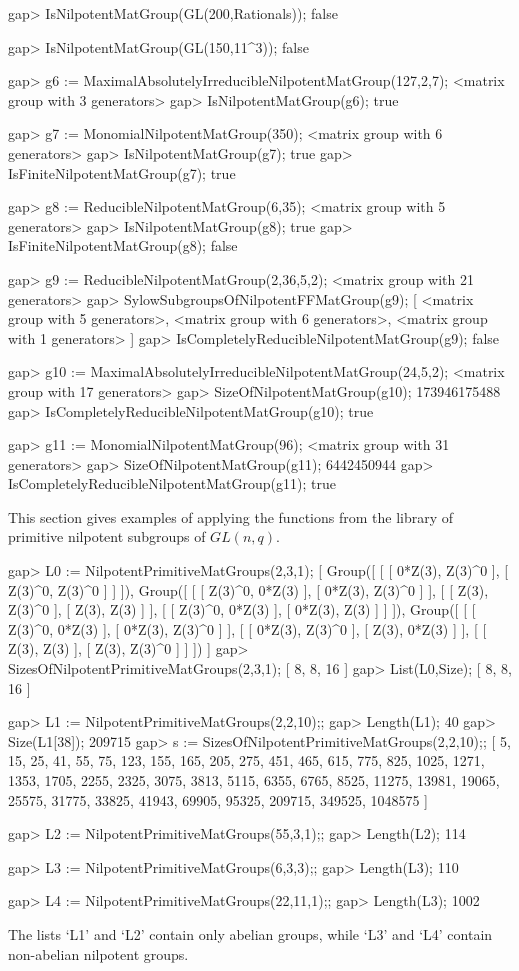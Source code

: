 \beginexample
gap> IsNilpotentMatGroup(GL(200,Rationals));
false

gap> IsNilpotentMatGroup(GL(150,11^3));
false

gap> g6 := MaximalAbsolutelyIrreducibleNilpotentMatGroup(127,2,7);
<matrix group with 3 generators>
gap> IsNilpotentMatGroup(g6);
true

gap> g7 := MonomialNilpotentMatGroup(350);
<matrix group with 6 generators>
gap> IsNilpotentMatGroup(g7);
true
gap> IsFiniteNilpotentMatGroup(g7);
true

gap> g8 := ReducibleNilpotentMatGroup(6,35);
<matrix group with 5 generators>
gap> IsNilpotentMatGroup(g8);
true
gap> IsFiniteNilpotentMatGroup(g8);
false

gap> g9 := ReducibleNilpotentMatGroup(2,36,5,2);
<matrix group with 21 generators>
gap> SylowSubgroupsOfNilpotentFFMatGroup(g9);
[ <matrix group with 5 generators>, <matrix group with 6
generators>, <matrix group with 1 generators> ]
gap> IsCompletelyReducibleNilpotentMatGroup(g9);
false

gap> g10 := MaximalAbsolutelyIrreducibleNilpotentMatGroup(24,5,2);
<matrix group with 17 generators>
gap> SizeOfNilpotentMatGroup(g10);
173946175488
gap> IsCompletelyReducibleNilpotentMatGroup(g10);
true

gap> g11 := MonomialNilpotentMatGroup(96);
<matrix group with 31 generators>
gap> SizeOfNilpotentMatGroup(g11);
6442450944
gap> IsCompletelyReducibleNilpotentMatGroup(g11);
true
\endexample


This section gives examples of applying the functions from the
 library of primitive nilpotent subgroups of $GL(n,q)$.

\beginexample
gap> L0 := NilpotentPrimitiveMatGroups(2,3,1);
[ Group([ [ [ 0*Z(3), Z(3)^0 ], [ Z(3)^0, Z(3)^0 ] ] ]),
  Group([ [ [ Z(3)^0, 0*Z(3) ], [ 0*Z(3), Z(3)^0 ] ],
      [ [ Z(3), Z(3)^0 ], [ Z(3), Z(3) ] ],
      [ [ Z(3)^0, 0*Z(3) ], [ 0*Z(3), Z(3) ] ] ]),
  Group([ [ [ Z(3)^0, 0*Z(3) ], [ 0*Z(3), Z(3)^0 ] ],
      [ [ 0*Z(3), Z(3)^0 ], [ Z(3), 0*Z(3) ] ],
      [ [ Z(3), Z(3) ], [ Z(3), Z(3)^0 ] ] ]) ]
gap> SizesOfNilpotentPrimitiveMatGroups(2,3,1);
[ 8, 8, 16 ]
gap> List(L0,Size);
[ 8, 8, 16 ]

gap> L1 := NilpotentPrimitiveMatGroups(2,2,10);;
gap> Length(L1);
40
gap> Size(L1[38]);
209715
gap> s := SizesOfNilpotentPrimitiveMatGroups(2,2,10);;
[ 5, 15, 25, 41, 55, 75, 123, 155,
165, 205, 275, 451, 465, 615, 775, 825, 1025, 1271, 1353, 1705,
2255, 2325, 3075, 3813, 5115, 6355, 6765, 8525, 11275, 13981,
19065, 25575, 31775, 33825, 41943, 69905, 95325, 209715,
349525, 1048575 ]

gap> L2 := NilpotentPrimitiveMatGroups(55,3,1);;
gap> Length(L2);
114

gap> L3 := NilpotentPrimitiveMatGroups(6,3,3);;
gap> Length(L3);
110

gap> L4 := NilpotentPrimitiveMatGroups(22,11,1);;
gap> Length(L3);
1002
\endexample

The lists `L1' and `L2' contain only abelian groups, while `L3' and
`L4' contain non-abelian nilpotent groups.
